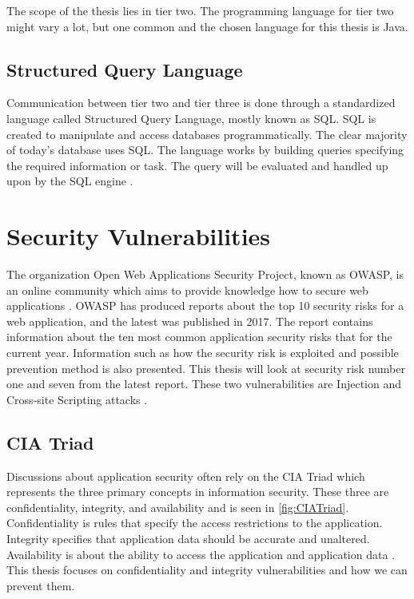 The scope of the thesis lies in tier two. The programming language for tier two might vary a lot, but one common and the chosen language for this thesis is Java.



\subsection{Structured Query Language}
Communication between tier two and tier three is done through a standardized language called Structured Query Language, mostly known as SQL. SQL is created to manipulate and access databases programmatically. The clear majority of today's database uses SQL. The language works by building queries specifying the required information or task. The query will be evaluated and handled up upon by the SQL engine \parencite{DarieCristian2003TPGt}.



\section{Security Vulnerabilities}
\label{SecurityVulnerabilities}
The organization Open Web Applications Security Project, known as OWASP, is an online community which aims to provide knowledge how to secure web applications \parencite{OpenWebApplicationSecurityProject}. OWASP has produced reports about the top 10 security risks for a web application, and the latest was published in 2017. The report contains information about the ten most common application security risks that for the current year. Information such as how the security risk is exploited and possible prevention method is also presented. This thesis will look at security risk number one and seven from the latest report. These two vulnerabilities are Injection and Cross-site Scripting attacks \parencite{OWASP2017}.



\subsection{CIA Triad}
Discussions about application security often rely on the CIA Triad which represents the three primary concepts in information security. These three are confidentiality, integrity, and availability and is seen in \ref{fig:CIATriad}. Confidentiality is rules that specify the access restrictions to the application. Integrity specifies that application data should be accurate and unaltered. Availability is about the ability to access the application and application data \parencite{2014C1-W}. This thesis focuses on confidentiality and integrity vulnerabilities and how we can prevent them.

